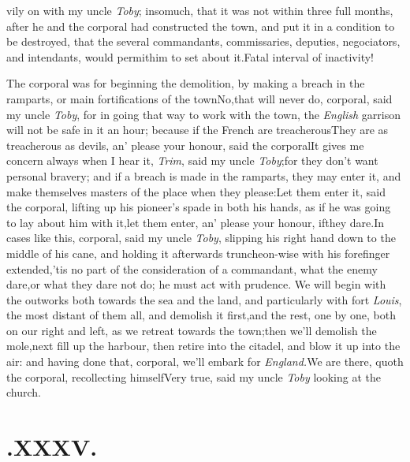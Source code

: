 \documentclass{article}
\begin{document}
\noindent
\stick{\indent\astfill}
\stick{\astfill}
vily on with my uncle \textit{Toby}; insomuch, that it
was not within three full months, after he and the corporal had
constructed the town, and put it in a condition to be destroyed,
that the several commandants, commissaries, deputies, negociators,
and intendants, would permit\pb him to set about
it.\tsh Fatal interval of inactivity!

The corporal was for beginning the demolition, by making a
breach in the ramparts, or main fortifications of the
town\tsh No,\tsk that will never do, corporal, said my
uncle \textit{Toby}, for in going that way to work with the town, the\break
\textit{English} garrison will not be safe in it an hour; because if
the French are treacherous\tsh They are as treacherous as devils,
an’ please your honour, said the corporal\tsh It
gives me concern always when I hear it, \textit{Trim}, said my uncle
\textit{Toby};\tsk for they don’t want personal bravery; and
if a breach is made in the ramparts, they may enter it, and make
themselves masters of the place when they please:\tsk Let them
enter it, said the corporal, lifting up his pioneer’s spade
in both his hands, as if he was going to lay about him with
it,\tsk let them enter, an’ please your honour, if\pb they
dare.\tsh In cases like this, corporal, said my uncle
\textit{Toby}, slipping his right hand down to the middle of his
cane, and holding it afterwards truncheon-wise with his forefinger
extended,\break\tsh ’tis no part of the consideration of a
commandant, what the enemy dare,\tsk or what they dare not do; he
must act with prudence. We will begin with the outworks both
towards the sea and the land, and particularly with fort
\textit{Louis}, the most distant of them all, and demolish it
first,\tsk and the rest, one by one, both on our right and left, as we retreat towards
the town;\tsh then we’ll demolish the
mole,\tsk next fill up the harbour,\break
\tsk then retire into the citadel, and blow it up into the air: and having done
that, corporal, we’ll embark for \textit{England.}\tsh We are there, quoth the
corporal, recollecting himself\tsh Very true, said my uncle \textit{Toby}\tsk
looking at the church.

\newpage
\vfill
\section{.\enspace XXXV.}
\end{document}
